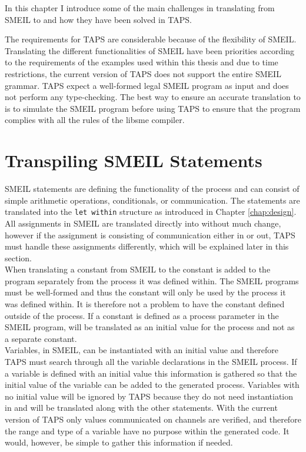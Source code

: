 In this chapter I introduce some of the main challenges in translating from SMEIL to \cspm{} and how they have been solved in TAPS.

The requirements for TAPS are considerable because of the flexibility of SMEIL. Translating the different functionalities of SMEIL have been priorities according to the requirements of the examples used within this thesis and due to time restrictions, the current version of TAPS does not support the entire SMEIL grammar. TAPS expect a well-formed legal SMEIL program as input and does not perform any type-checking. The best way to ensure an accurate translation to \cspm{} is to simulate the SMEIL program before using TAPS to ensure that the program complies with all the rules of the libsme compiler.
\section{Transpiling SMEIL Statements}
SMEIL statements are defining the functionality of the process and can consist of simple arithmetic operations, conditionals, or communication.
The statements are translated into the \texttt{let within} structure as introduced in Chapter \ref{chap:design}.\\

All assignments in SMEIL are translated directly into \cspm{} without much change, however if the assignment is consisting of communication either in or out, TAPS must handle these assignments differently, which will be explained later in this section.\\

When translating a constant from SMEIL to \cspm{} the constant is added to the \cspm{} program separately from the process it was defined within.
The SMEIL programs must be well-formed and thus the constant will only be used by the process it was defined within. It is therefore not a problem to have the constant defined outside of the \cspm{} process. If a constant is defined as a process parameter in the SMEIL program, will be translated as an initial value for the process and not as a separate \cspm{} constant.\\

Variables, in SMEIL, can be instantiated with an initial value and therefore TAPS must search through all the variable declarations in the SMEIL process. If a variable is defined with an initial value this information is gathered so that the initial value of the variable can be added to the generated \cspm{} process.
Variables with no initial value will be ignored by TAPS because they do not need instantiation in \cspm{} and will be translated along with the other statements. With the current version of TAPS only values communicated on channels are verified, and therefore the range and type of a variable have no purpose within the generated \cspm{} code. It would, however, be simple to gather this information if needed.\\

